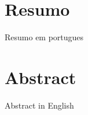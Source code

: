 \clearpage
{}
{}
\chapter*{Resumo}
\thispagestyle{empty}

Resumo em portugues
\clearpage
{}
{}
\chapter*{Abstract}
\thispagestyle{empty}

Abstract in English